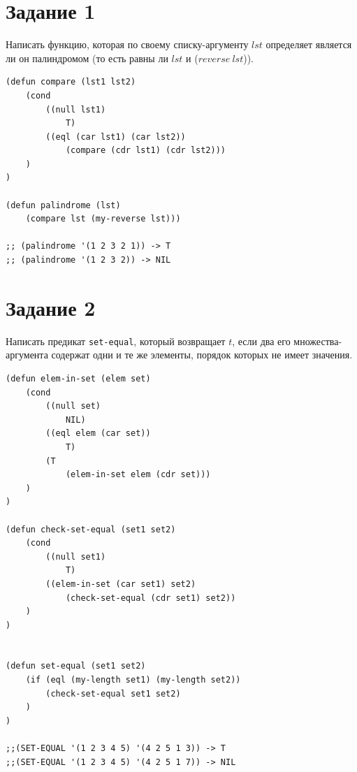\documentclass[a4paper,14pt, unknownkeysallowed]{extreport}
\begin{document}
\section{Задание 1}

Написать функцию, которая по своему списку-аргументу $lst$ определяет является ли он палиндромом (то есть равны ли $lst$ и ($reverse \ lst$)).

\begin{center}
\captionsetup{justification=raggedright,singlelinecheck=off}
\begin{lstlisting}[label=lst:parallel_processing,caption=Решение задания 1]
(defun compare (lst1 lst2)
    (cond 
        ((null lst1)
            T)
        ((eql (car lst1) (car lst2)) 
            (compare (cdr lst1) (cdr lst2)))
    )
)

(defun palindrome (lst)
    (compare lst (my-reverse lst)))

;; (palindrome '(1 2 3 2 1)) -> T
;; (palindrome '(1 2 3 2)) -> NIL
\end{lstlisting}
\end{center}

\clearpage

\section{Задание 2}

Написать предикат \texttt{set-equal}, который возвращает $t$, если два его множества-аргумента содержат одни и те же элементы, порядок которых не имеет значения.

\begin{center}
\captionsetup{justification=raggedright,singlelinecheck=off}
\begin{lstlisting}[label=lst:parallel_processing,caption=Решение задания 2]
(defun elem-in-set (elem set)
    (cond 
        ((null set)
            NIL)
        ((eql elem (car set)) 
            T)
        (T
            (elem-in-set elem (cdr set)))
    )
)

(defun check-set-equal (set1 set2)
    (cond 
        ((null set1)
            T)
        ((elem-in-set (car set1) set2) 
            (check-set-equal (cdr set1) set2))
    )
)


(defun set-equal (set1 set2)
    (if (eql (my-length set1) (my-length set2))
        (check-set-equal set1 set2)
    )
)

;;(SET-EQUAL '(1 2 3 4 5) '(4 2 5 1 3)) -> T
;;(SET-EQUAL '(1 2 3 4 5) '(4 2 5 1 7)) -> NIL
\end{lstlisting}
\end{center}
\end{document}
